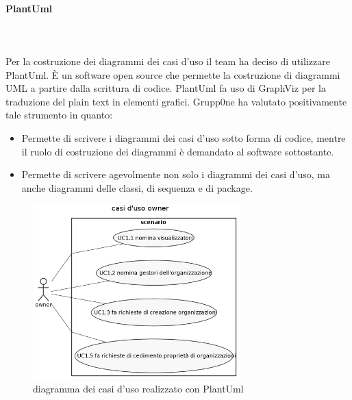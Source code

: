 \documentclass[../norme-di-progetto.tex]{subfiles}
\begin{document}
\paragraph{PlantUml}\mbox{}\\
\label{par:plantuml}
\\ Per la costruzione dei diagrammi dei casi d'uso il team ha deciso di utilizzare PlantUml. È un software open source che permette la costruzione di diagrammi UML a partire dalla scrittura di codice. PlantUml fa uso di GraphViz per la traduzione del plain text in elementi grafici. Grupp0ne ha valutato positivamente tale strumento in quanto:
\begin{itemize}
	\item Permette di scrivere i diagrammi dei casi d'uso sotto forma di codice, mentre il ruolo di costruzione dei diagrammi è demandato al software sottostante.
	\item Permette di scrivere agevolmente non solo i diagrammi dei casi d'uso, ma anche diagrammi delle classi, di sequenza e di package.
\end{itemize}
\begin{figure}[H]
\includegraphics[width=8cm]{components/img/owner_use_cases.png}
\centering
\caption{diagramma dei casi d'uso realizzato con PlantUml}
\end{figure}
\end{document}
